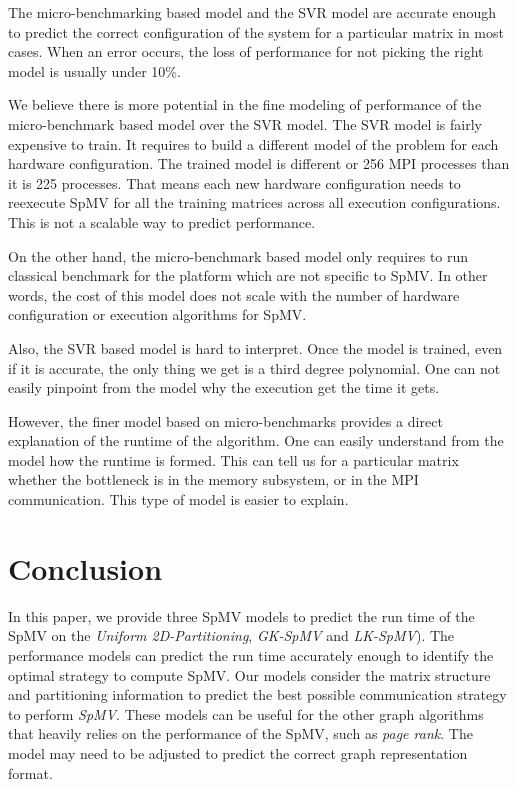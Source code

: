 \documentclass[sigconf,review,anonymous]{acmart}
\begin{document}
The micro-benchmarking based model and the SVR model are accurate
enough to predict the correct configuration of the system for a
particular matrix in most cases. When an error occurs, the loss of
performance for not picking the right model is usually under 10\%.

We believe there is more potential in the fine modeling of performance
of the micro-benchmark based model over the SVR model. The SVR model
is fairly expensive to train. It requires to build a different model
of the problem for each hardware configuration. The trained model is
different or 256 MPI processes than it is 225 processes. That means
each new hardware configuration needs to reexecute SpMV for all the
training matrices across all execution configurations. This is not a
scalable way to predict performance.

On the other hand, the micro-benchmark based model only requires to
run classical benchmark for the platform which are not specific to
SpMV. In other words, the cost of this model does not scale with the
number of hardware configuration or execution algorithms for SpMV.

Also, the SVR based model is hard to interpret. Once the model is
trained, even if it is accurate, the only thing we get is a third
degree polynomial. One can not easily pinpoint from the model why the
execution get the time it gets.

However, the finer model based on micro-benchmarks provides a direct
explanation of the runtime of the algorithm. One can easily understand
from the model how the runtime is formed. This can tell us for a
particular matrix whether the bottleneck is in the memory subsystem,
or in the MPI communication. This type of model is easier to explain.



\section{Conclusion}
In this paper, we provide three SpMV models to predict the run time of the
SpMV on the \textit{Uniform 2D-Partitioning}, \textit{GK-SpMV} and \textit{LK-SpMV}). 
The performance models can predict the run time accurately enough to identify the
optimal strategy to compute SpMV. Our models consider the matrix structure and partitioning information to 
predict the best possible communication strategy to perform
\textit{SpMV}. These models can be useful for the other graph
algorithms that heavily relies on the performance of the SpMV, such as
\textit{page rank}. The model may need to be adjusted to predict the
correct graph representation format.
\end{document}
